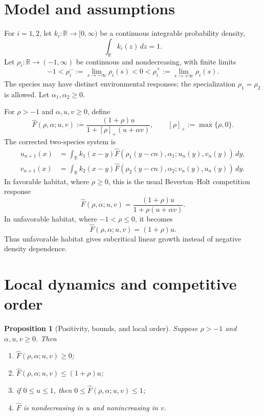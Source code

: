 \documentclass[11pt]{article}
\newtheorem{proposition}[theorem]{Proposition}
\theoremstyle{definition}
\newcommand{\R}{\mathbb R}
\newcommand{\Fhat}{\widehat F}
\begin{document}
\section{Model and assumptions}

For \(i=1,2\), let \(k_i\colon\R\to[0,\infty)\) be a continuous integrable
probability density,
\[
  \int_{\R}k_i(z)\,dz=1.
\]
Let \(\rho_i\colon\R\to(-1,\infty)\) be continuous and nondecreasing, with
finite limits
\[
  -1<\rho_i^-:=\lim_{s\to-\infty}\rho_i(s)<0
  <\rho_i^+:=\lim_{s\to+\infty}\rho_i(s).
\]
The species may have distinct environmental responses; the specialization
\(\rho_1=\rho_2\) is allowed.  Let \(\alpha_1,\alpha_2\geq0\).

For \(\rho>-1\) and \(\alpha,u,v\geq0\), define
\begin{equation}\label{eq:corrected-response}
  \Fhat(\rho,\alpha;u,v)
  :=
  \frac{(1+\rho)u}
       {1+[\rho]_+(u+\alpha v)},
  \qquad
  [\rho]_+:=\max\{\rho,0\}.
\end{equation}
The corrected two-species system is
\begin{align}
  u_{n+1}(x)
  &=
  \int_{\R}k_1(x-y)
  \Fhat\!\left(
    \rho_1(y-cn),\alpha_1;u_n(y),v_n(y)
  \right)\,dy,
  \label{eq:corrected-u}\\
  v_{n+1}(x)
  &=
  \int_{\R}k_2(x-y)
  \Fhat\!\left(
    \rho_2(y-cn),\alpha_2;v_n(y),u_n(y)
  \right)\,dy.
  \label{eq:corrected-v}
\end{align}
In favorable habitat, where \(\rho\geq0\), this is the usual
Beverton--Holt competition response
\[
  \Fhat(\rho,\alpha;u,v)
  =
  \frac{(1+\rho)u}{1+\rho(u+\alpha v)}.
\]
In unfavorable habitat, where \(-1<\rho\leq0\), it becomes
\[
  \Fhat(\rho,\alpha;u,v)=(1+\rho)u.
\]
Thus unfavorable habitat gives subcritical linear growth instead of
negative density dependence.

\section{Local dynamics and competitive order}

\begin{proposition}[Positivity, bounds, and local order]
\label{prop:local-order}
Suppose \(\rho>-1\) and \(\alpha,u,v\geq0\).  Then
\begin{enumerate}[label=(\roman*)]
  \item \(\Fhat(\rho,\alpha;u,v)\geq0\);
  \item \(\Fhat(\rho,\alpha;u,v)\leq(1+\rho)u\);
  \item if \(0\leq u\leq1\), then
        \(0\leq\Fhat(\rho,\alpha;u,v)\leq1\);
  \item \(\Fhat\) is nondecreasing in \(u\) and nonincreasing in \(v\).
\end{enumerate}
\end{proposition}
\end{document}
